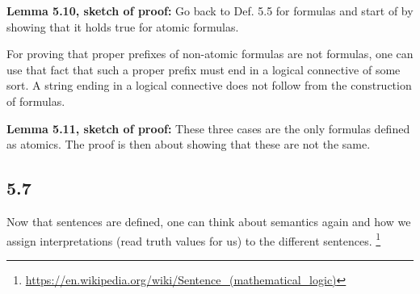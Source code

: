 {\bf Lemma 5.10, sketch of proof:} Go back to Def. 5.5 for formulas and start of by showing that it holds true for atomic formulas.

For proving that proper prefixes of non-atomic formulas are not formulas, one can use that fact that such a proper prefix must end in a logical connective of some sort. A string ending in a logical connective does not follow from the construction of formulas. 

{\bf Lemma 5.11, sketch of proof:} These three cases are the only formulas defined as atomics. The proof is then about showing that these are not the same. 

\subsection*{5.7}
Now that sentences are defined, one can think about semantics again and how we assign interpretations (read truth values for us) to the different sentences. \footnote{\url{https://en.wikipedia.org/wiki/Sentence_(mathematical_logic)}}